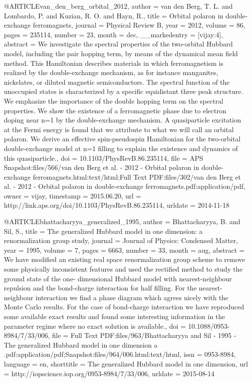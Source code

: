 @ARTICLE{van_den_berg_orbital_2012,
  author = {van den Berg, T. L. and Lombardo, P. and Kuzian, R. O. and Hayn,
	R.},
  title = {Orbital polaron in double-exchange ferromagnets},
  journal = {Physical Review B},
  year = {2012},
  volume = {86},
  pages = {235114},
  number = {23},
  month = dec,
  __markedentry = {[vijay:4]},
  abstract = {We investigate the spectral properties of the two-orbital Hubbard
	model, including the pair hopping term, by means of the dynamical
	mean field method. This Hamiltonian describes materials in which
	ferromagnetism is realized by the double-exchange mechanism, as for
	instance manganites, nickelates, or diluted magnetic semiconductors.
	The spectral function of the unoccupied states is characterized by
	a specific equidistant three peak structure. We emphasize the importance
	of the double hopping term on the spectral properties. We show the
	existence of a ferromagnetic phase due to electron doping near n=1
	by the double-exchange mechanism. A quasiparticle excitation at the
	Fermi energy is found that we attribute to what we will call an orbital
	polaron. We derive an effective spin-pseudospin Hamiltonian for the
	two-orbital double-exchange model at n=1 filling to explain the existence
	and dynamics of this quasiparticle.},
  doi = {10.1103/PhysRevB.86.235114},
  file = {APS Snapshot:files/566/van den Berg et al. - 2012 - Orbital polaron in double-exchange ferromagnets.html:text/html;Full Text PDF:files/302/van den Berg et al. - 2012 - Orbital polaron in double-exchange ferromagnets.pdf:application/pdf},
  owner = {vijay},
  timestamp = {2015.06.20},
  url = {http://link.aps.org/doi/10.1103/PhysRevB.86.235114},
  urldate = {2014-11-18}
}

@ARTICLE{bhattacharyya_generalized_1995,
  author = {Bhattacharyya, B. and Sil, S.},
  title = {The generalized {Hubbard} model in one dimension: a renormalization
	group study},
  journal = {Journal of Physics: Condensed Matter},
  year = {1995},
  volume = {7},
  pages = {6663},
  number = {33},
  month = aug,
  abstract = {We have modified an existing real space renormalization group scheme
	to remove some physically inconsistent features and used the rectified
	method to study the ground state of the one- dimensional Hubbard
	model with nearest-neighbour repulsion and the bond-charge interaction
	for half filling. For the nearest-neighbour interaction we find a
	phase diagram which agrees nicely with the Monte Carlo results. For
	the case of bond-charge interaction we have reproduced some available
	exact results and found some interesting information in the parameter
	regime where no exact solution is available.},
  doi = {10.1088/0953-8984/7/33/006},
  file = {Full Text PDF:files/963/Bhattacharyya and Sil - 1995 - The generalized Hubbard model in one   dimension a .pdf:application/pdf;Snapshot:files/964/006.html:text/html},
  issn = {0953-8984},
  language = {en},
  shorttitle = {The generalized {Hubbard} model in one dimension},
  url = {http://iopscience.iop.org/0953-8984/7/33/006},
  urldate = {2015-08-14}
}

